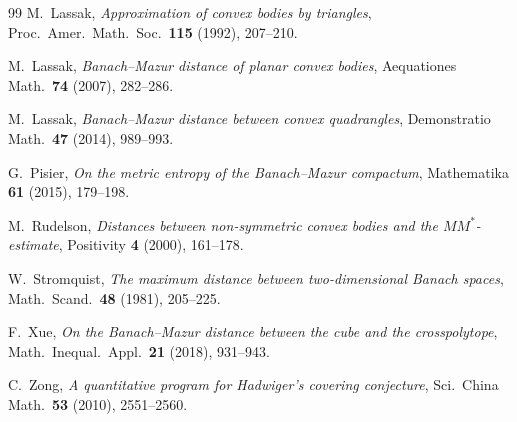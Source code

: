 \documentclass[11pt]{amsart}
\theoremstyle{definition}
\theoremstyle{remark}
\begin{document}
\begin{thebibliography}{99}
M.~Lassak, \emph{Approximation of convex bodies by triangles}, Proc.\ Amer.\ Math.\ Soc.\ \textbf{115} (1992), 207--210.

M.~Lassak, \emph{Banach--Mazur distance of planar convex bodies}, Aequationes Math.\ \textbf{74} (2007), 282--286.

M.~Lassak, \emph{Banach--Mazur distance between convex quadrangles}, Demonstratio Math.\ \textbf{47} (2014), 989--993.

G.~Pisier, \emph{On the metric entropy of the Banach--Mazur compactum}, Mathematika \textbf{61} (2015), 179--198.

M.~Rudelson, \emph{Distances between non-symmetric convex bodies and the $MM^*$-estimate}, Positivity \textbf{4} (2000),
161--178.

W.~Stromquist, \emph{The maximum distance between two-dimensional Banach spaces}, Math.\ Scand.\ \textbf{48} (1981), 205--225.

F.~Xue, \emph{On the Banach--Mazur distance between the cube and the crosspolytope}, Math.\ Inequal.\ Appl.\ \textbf{21}
(2018), 931--943.

C.~Zong, \emph{A quantitative program for Hadwiger's covering conjecture}, Sci.\ China Math.\ \textbf{53} (2010), 2551--2560.

\end{thebibliography}
\end{document}
